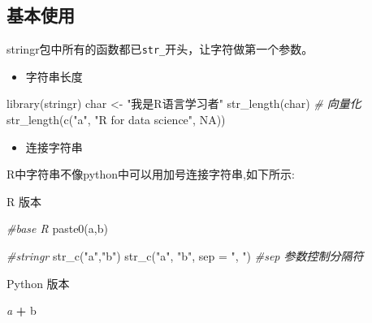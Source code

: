 \documentclass[
]{book}
\newenvironment{Shaded}{\begin{snugshade}}{\end{snugshade}}
\newcommand{\AttributeTok}[1]{\textcolor[rgb]{0.77,0.63,0.00}{#1}}
\newcommand{\CommentTok}[1]{\textcolor[rgb]{0.56,0.35,0.01}{\textit{#1}}}
\newcommand{\ConstantTok}[1]{\textcolor[rgb]{0.00,0.00,0.00}{#1}}
\newcommand{\FunctionTok}[1]{\textcolor[rgb]{0.00,0.00,0.00}{#1}}
\newcommand{\NormalTok}[1]{#1}
\newcommand{\OperatorTok}[1]{\textcolor[rgb]{0.81,0.36,0.00}{\textbf{#1}}}
\newcommand{\OtherTok}[1]{\textcolor[rgb]{0.56,0.35,0.01}{#1}}
\newcommand{\StringTok}[1]{\textcolor[rgb]{0.31,0.60,0.02}{#1}}
\providecommand{\tightlist}{%
  \setlength{\itemsep}{0pt}\setlength{\parskip}{0pt}}
\begin{document}
\hypertarget{stringr-usage}{%
\subsection{基本使用}\label{stringr-usage}}

stringr包中所有的函数都已\texttt{str\_}开头，让字符做第一个参数。

\begin{itemize}
\tightlist
\item
  字符串长度
\end{itemize}

\begin{Shaded}
\begin{Highlighting}[]
\FunctionTok{library}\NormalTok{(stringr)}
\NormalTok{char }\OtherTok{\textless{}{-}} \StringTok{"我是R语言学习者"}
\FunctionTok{str\_length}\NormalTok{(char)}
\CommentTok{\# 向量化}
\FunctionTok{str\_length}\NormalTok{(}\FunctionTok{c}\NormalTok{(}\StringTok{"a"}\NormalTok{, }\StringTok{"R for data science"}\NormalTok{, }\ConstantTok{NA}\NormalTok{))}
\end{Highlighting}
\end{Shaded}

\begin{itemize}
\tightlist
\item
  连接字符串
\end{itemize}

R中字符串不像python中可以用加号连接字符串,如下所示:

R 版本

\begin{Shaded}
\begin{Highlighting}[]
\CommentTok{\#base R}
\FunctionTok{paste0}\NormalTok{(}\StringTok{\textquotesingle{}a\textquotesingle{}}\NormalTok{,}\StringTok{\textquotesingle{}b\textquotesingle{}}\NormalTok{)}

\CommentTok{\#stringr}
\FunctionTok{str\_c}\NormalTok{(}\StringTok{"a"}\NormalTok{,}\StringTok{"b"}\NormalTok{)}
\FunctionTok{str\_c}\NormalTok{(}\StringTok{"a"}\NormalTok{, }\StringTok{"b"}\NormalTok{, }\AttributeTok{sep =} \StringTok{", "}\NormalTok{) }\CommentTok{\#sep 参数控制分隔符}
\end{Highlighting}
\end{Shaded}

Python 版本

\begin{Shaded}
\begin{Highlighting}[]
\CommentTok{\textquotesingle{}a\textquotesingle{}} \OperatorTok{+} \StringTok{\textquotesingle{}b\textquotesingle{}}
\end{Highlighting}
\end{Shaded}
\end{document}

